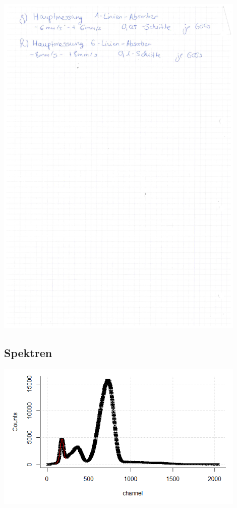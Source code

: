 \begin{minipage}{\textwidth}
	\centering
	\includegraphics[width=0.9\textwidth]{../figures/laborbuch2.pdf}
\end{minipage}

\subsection{Spektren}
\label{spektren}
\begin{minipage}{\textwidth}
	\centering
	\includegraphics[width=0.9\textwidth]{../figures/RbEichung.png}
\end{minipage}

